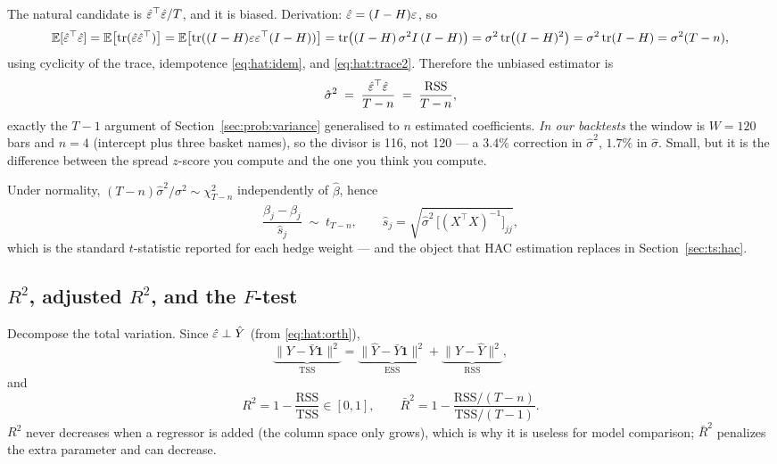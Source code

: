 The natural candidate is $\hat{\varepsilon}^{\top}\hat{\varepsilon}/T$, and it is biased. Derivation:
$\hat{\varepsilon}=(I-H)\varepsilon$, so
\[
  \mathbb{E}[\hat{\varepsilon}^{\top}\hat{\varepsilon}] = \mathbb{E}\bigl[\operatorname{tr}(\hat{\varepsilon}\hat{\varepsilon}^{\top})\bigr]
  = \mathbb{E}\bigl[\operatorname{tr}((I-H)\varepsilon\varepsilon^{\top}(I-H))\bigr]
  = \operatorname{tr}\bigl((I-H)\,\sigma^2 I\,(I-H)\bigr)
  = \sigma^2\operatorname{tr}\bigl((I-H)^2\bigr)
  = \sigma^2\operatorname{tr}(I-H) = \sigma^2(T-n),
\]
using cyclicity of the trace, idempotence \eqref{eq:hat:idem}, and
\eqref{eq:hat:trace2}. Therefore the unbiased estimator is
\begin{equation}
  \hat\sigma^{2} \;=\; \frac{\hat{\varepsilon}^{\top}\hat{\varepsilon}}{T-n}
  \;=\; \frac{\mathrm{RSS}}{T-n},
  \label{eq:sigma2hat}
\end{equation}
exactly the $T-1$ argument of Section~\ref{sec:prob:variance} generalised to $n$
estimated coefficients. \emph{In our backtests} the window is $W=120$ bars and $n=4$
(intercept plus three basket names), so the divisor is 116, not 120 --- a $3.4\%$
correction in $\hat\sigma^2$, $1.7\%$ in $\hat\sigma$. Small, but it is the difference
between the spread $z$-score you compute and the one you think you compute.

Under normality, $(T-n)\hat\sigma^2/\sigma^2\sim\chi^2_{T-n}$ independently of
$\hat\beta$, hence
\begin{equation}
  \frac{\hat\beta_j-\beta_j}{\hat s_j}\;\sim\; t_{T-n},
  \qquad \hat s_j = \sqrt{\hat\sigma^2\,\bigl[(X^{\top}X)^{-1}\bigr]_{jj}},
  \label{eq:tstat}
\end{equation}
which is the standard $t$-statistic reported for each hedge weight --- and the object
that HAC estimation replaces in Section~\ref{sec:ts:hac}.

\subsection{$R^2$, adjusted $R^2$, and the $F$-test}
\label{sec:ols:r2}

Decompose the total variation. Since $\hat{\varepsilon}\perp\hat Y$ (from \eqref{eq:hat:orth}),
\[
  \underbrace{\lVert Y-\bar Y\mathbf 1\rVert^2}_{\mathrm{TSS}}
  = \underbrace{\lVert \hat Y-\bar Y\mathbf 1\rVert^2}_{\mathrm{ESS}}
  + \underbrace{\lVert Y-\hat Y\rVert^2}_{\mathrm{RSS}},
\]
and
\begin{equation}
  R^2 = 1-\frac{\mathrm{RSS}}{\mathrm{TSS}}\in[0,1],
  \qquad
  \bar R^2 = 1-\frac{\mathrm{RSS}/(T-n)}{\mathrm{TSS}/(T-1)} .
  \label{eq:r2}
\end{equation}
$R^2$ never decreases when a regressor is added (the column space only grows), which is
why it is useless for model comparison; $\bar R^2$ penalizes the extra parameter and can
decrease.

